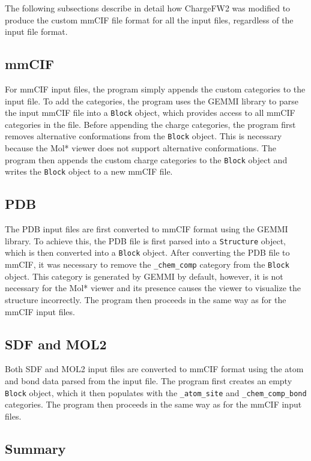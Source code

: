 \documentclass[
  digital,     %
  oneside,     %
  nosansbold,  %
  nocolorbold, %
  lof,         %
  lot,         %
]{fithesis4}
\begin{document}
The following subsections describe in detail how ChargeFW2 was modified to produce the custom mmCIF file format for all the input files, regardless of the input file format.

\subsection*{mmCIF}

For mmCIF input files, the program simply appends the custom categories to the input file. To add the categories, the program uses the GEMMI library \cite{wojdyr2022gemmi} to parse the input mmCIF file into a \texttt{Block} object, which provides access to all mmCIF categories in the file. Before appending the charge categories, the program first removes alternative conformations from the \texttt{Block} object. This is necessary because the Mol* viewer does not support alternative conformations. The program then appends the custom charge categories to the \texttt{Block} object and writes the \texttt{Block} object to a new mmCIF file.

\subsection*{PDB}

The PDB input files are first converted to mmCIF format using the GEMMI library. To achieve this, the PDB file is first parsed into a \texttt{Structure} object, which is then converted into a \texttt{Block} object. After converting the PDB file to mmCIF, it was necessary to remove the \texttt{\_chem\_comp} category from the \texttt{Block} object. This category is generated by GEMMI by default, however, it is not necessary for the Mol* viewer and its presence causes the viewer to visualize the structure incorrectly. The program then proceeds in the same way as for the mmCIF input files.

\subsection*{SDF and MOL2}

Both SDF and MOL2 input files are converted to mmCIF format using the atom and bond data parsed from the input file. The program first creates an empty \texttt{Block} object, which it then populates with the \texttt{\_atom\_site} and \texttt{\_chem\_comp\_bond} categories. The program then proceeds in the same way as for the mmCIF input files.

\subsection*{Summary}
\end{document}
